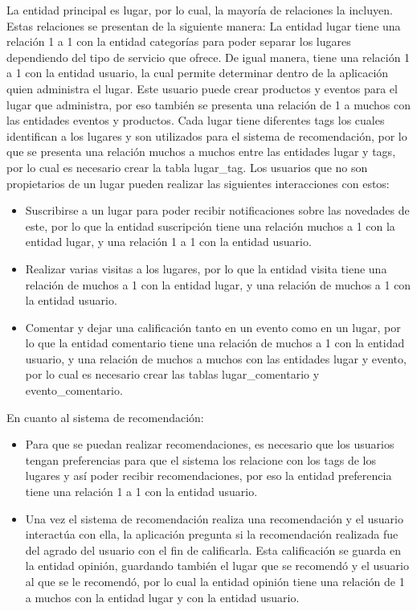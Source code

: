 \documentclass[12pt,letterpaper,openany]{book}
\begin{document}
La entidad principal es lugar, por lo cual, la mayoría de relaciones la incluyen. Estas relaciones se presentan de la siguiente manera:
\vspace{5mm}\newline
La entidad lugar tiene una relación 1 a 1 con la entidad categorías para poder separar los lugares dependiendo del tipo de servicio que ofrece. De igual manera, tiene una relación 1 a 1 con la entidad usuario, la cual permite determinar dentro de la aplicación quien administra el lugar. Este usuario puede crear productos y eventos para el lugar que administra, por eso también se presenta una relación de 1 a muchos con las entidades eventos y productos.
\vspace{5mm}\newline
Cada lugar tiene diferentes tags los cuales identifican a los lugares y son utilizados para el sistema de recomendación, por lo que se presenta una relación muchos a muchos entre las entidades lugar y tags, por lo cual es necesario crear la tabla lugar\_tag.
\vspace{5mm}\newline
Los usuarios que no son propietarios de un lugar pueden realizar las siguientes interacciones con estos: 
\begin{itemize}
    \item Suscribirse a un lugar para poder recibir notificaciones sobre las novedades de este, por lo que la entidad suscripción tiene una relación muchos a 1 con la entidad lugar, y una relación 1 a 1 con la entidad usuario.
    \item Realizar varias visitas a los lugares, por lo que la entidad visita tiene una relación de muchos a 1 con la entidad lugar, y una relación de muchos a 1 con la entidad usuario.
    \item Comentar y dejar una calificación tanto en un evento como en un lugar, por lo que la entidad comentario tiene una relación de muchos a 1 con la entidad usuario, y una relación de muchos a muchos con las entidades lugar y evento, por lo cual es necesario crear las tablas lugar\_comentario y evento\_comentario.
\end{itemize}

\vspace{5mm}
En cuanto al sistema de recomendación:
\begin{itemize}
    \item Para que se puedan realizar recomendaciones, es necesario que los usuarios tengan preferencias para que el sistema los relacione con los tags de los lugares y así poder recibir recomendaciones, por eso la entidad preferencia tiene una relación 1 a 1 con la entidad usuario.
    \item Una vez el sistema de recomendación realiza una recomendación y el usuario interactúa con ella, la aplicación pregunta si la recomendación realizada fue del agrado del usuario con el fin de calificarla. Esta calificación se guarda en la entidad opinión, guardando también el lugar que se recomendó y el usuario al que se le recomendó, por lo cual la entidad opinión tiene una relación de 1 a muchos con la entidad lugar y con la entidad usuario.
\end{itemize}
\end{document}
